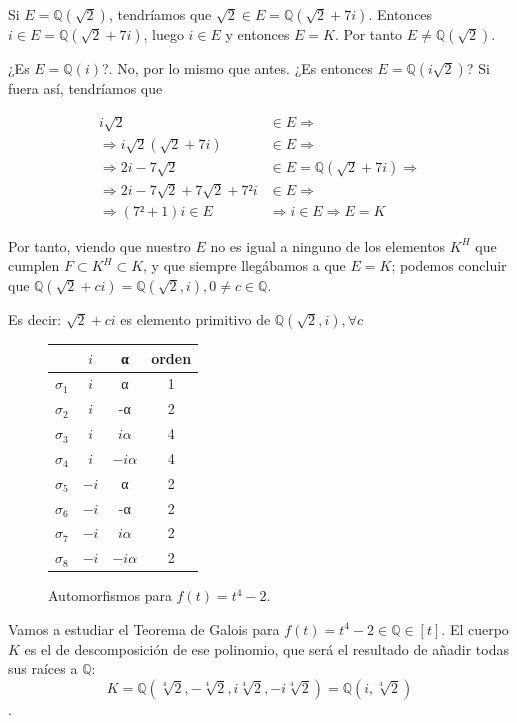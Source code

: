 \documentclass{apuntes}
\begin{document}
\begin{example}
Si $E = ℚ(\sqrt{2})$, tendríamos que $\sqrt{2} ∈ E = ℚ(\sqrt{2} + 7i)$. Entonces $i ∈ E = ℚ(\sqrt{2} + 7i)$, luego $i ∈ E$ y entonces $E = K$. Por tanto $E ≠ ℚ(\sqrt{2})$.

¿Es $E = ℚ(i)$?. No, por lo mismo que antes. ¿Es entonces $E = ℚ(i\sqrt{2})$? Si fuera así, tendríamos que

\begin{align*}
i\sqrt{2} &∈ E \Rightarrow \\
\Rightarrow i\sqrt{2} (\sqrt{2} + 7i) &∈ E \Rightarrow \\
\Rightarrow 2i - 7\sqrt{2} &∈ E = ℚ(\sqrt{2} + 7i) \Rightarrow \\
\Rightarrow 2i - 7\sqrt{2} + 7\sqrt{2} + 7²i &∈ E \Rightarrow \\
\Rightarrow (7²+1)i ∈ E &\Rightarrow i ∈ E \Rightarrow E = K
\end{align*}

Por tanto, viendo que nuestro $E$ no es igual a ninguno de los elementos $K^H$ que cumplen $F \subset K^H \subset K$, y que siempre llegábamos a que $E=K$; podemos concluir que $ℚ(\sqrt{2} + ci) = ℚ(\sqrt{2}, i), 0 ≠ c ∈ ℚ$.

Es decir: $\sqrt{2} + ci$ es elemento primitivo de $ℚ(\sqrt{2}, i), ∀c$
\end{example}

\begin{figure}
\centering
\begin{tabular}{r|c|c|c}
$\;$  & $i$ & α & orden\\\hline
$σ_1$ & $i$ &  α & 1 \\
$σ_2$ & $i$ & -α & 2 \\
$σ_3$ & $i$ & $iα$ & 4\\
$σ_4$ & $i$ & $-iα$ & 4\\\hline
$σ_5$ & $-i$ & α & 2\\
$σ_6$ & $-i$ & -α & 2\\
$σ_7$ & $-i$ & $iα$ & 2\\
$σ_8$ & $-i$ & $-iα$ & 2 \\
\end{tabular}
\caption{Automorfismos para $f(t) = t^4 - 2$.}
\label{tblGaloisT4-2}
\end{figure}

Vamos a estudiar el Teorema de Galois para $f(t) = t^4 - 2 ∈ ℚ∈[t]$. El cuerpo $K$ es el de descomposición de ese polinomio, que será el resultado de añadir todas sus raíces a $ℚ$: \[ K = ℚ(\sqrt[4]{2}, -\sqrt[4]{2}, i\sqrt[4]{2}, -i\sqrt[4]{2}) = ℚ(i, \sqrt[4]{2}) \].
\end{document}
